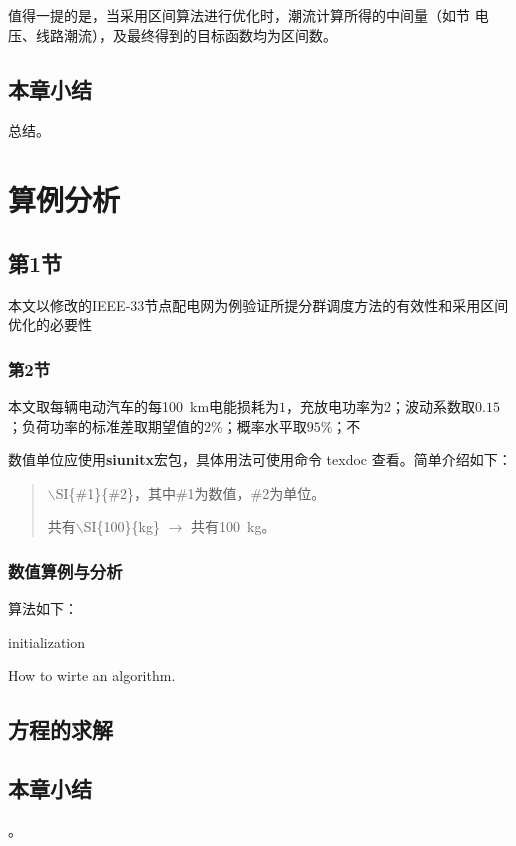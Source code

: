 \documentclass[bachelor]{NCEPU-thesis}
\begin{document}
值得一提的是，当采用区间算法进行优化时，潮流计算所得的中间量（如节 电压、线路潮流），及最终得到的目标函数均为区间数。

\section{本章小结}
总结。


\chapter{算例分析}
\section{第1节}
本文以修改的IEEE-33节点配电网为例验证所提分群调度方法的有效性和采用区间优化的必要性
\subsection{第2节}
本文取每辆电动汽车的每\SI{100}{km}电能损耗为$1$，充放电功率为$2$；波动系数取$0.15$；负荷功率的标准差取期望值的$2\%$；概率水平取$95\%$；不

数值单位应使用\textbf{siunitx}宏包，具体用法可使用命令 texdoc 查看。简单介绍如下：
\begin{quote}
$\backslash$SI\{\#1\}\{\#2\}，其中\#1为数值，\#2为单位。

共有$\backslash$SI\{100\}\{kg\} $\rightarrow$ 共有\SI{100}{kg}。
\end{quote}

\subsection{数值算例与分析}
算法如下：

\begin{algorithm}[H]
 initialization\;
 \caption{How to wirte an algorithm.}
\end{algorithm}


\section{方程的求解}

\section{本章小结}
。
\end{document}

